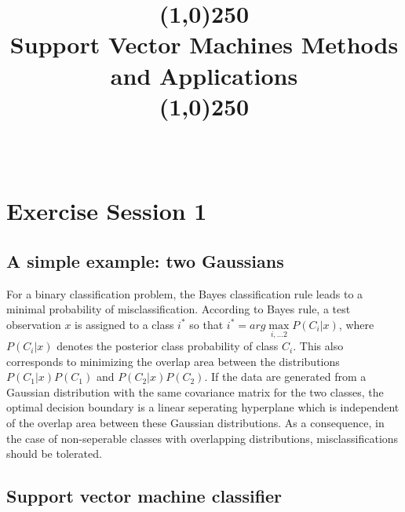 \documentclass[conference,compsoc]{IEEEtran}
\begin{document}
%
\title{\line(1,0){250}\\Support Vector Machines Methods and Applications\\\line(1,0){250}}


\author{
\\
}


\onecolumn

% 
\maketitle




\IEEEpeerreviewmaketitle




\thispagestyle{plain}
\pagestyle{plain}
\onecolumn

\section{Exercise Session 1}
\subsection{A simple example: two Gaussians}

For a binary classification problem, the Bayes classification rule leads to a minimal probability of misclassification. According to Bayes rule, a test observation $x$ is assigned to a class $i^*$ so that $i^* = arg \max\limits_{i,\dots 2} P(C_i|x)$, where $P(C_i|x)$ denotes the posterior class probability of class $C_i$. This also corresponds to minimizing the overlap area between the distributions $P(C_1|x)P(C_1)$ and $P(C_2|x)P(C_2)$. If the data are generated from a Gaussian distribution with the same covariance matrix for the two classes, the optimal decision boundary is a linear seperating hyperplane which is independent of the overlap area between these Gaussian distributions. As a consequence, in the case of non-seperable classes with overlapping distributions, misclassifications should be tolerated.


\subsection{Support vector machine classifier}
\end{document}
